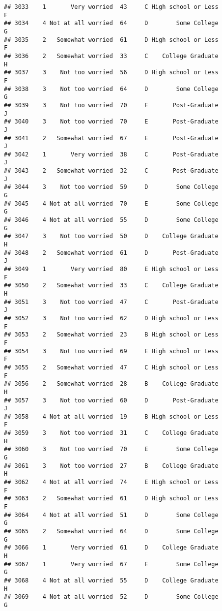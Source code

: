 \documentclass[
]{article}
\begin{document}
\begin{verbatim}
## 3033    1       Very worried  43     C High school or Less         F
## 3034    4 Not at all worried  64     D        Some College         G
## 3035    2   Somewhat worried  61     D High school or Less         F
## 3036    2   Somewhat worried  33     C    College Graduate         H
## 3037    3    Not too worried  56     D High school or Less         F
## 3038    3    Not too worried  64     D        Some College         G
## 3039    3    Not too worried  70     E       Post-Graduate         J
## 3040    3    Not too worried  70     E       Post-Graduate         J
## 3041    2   Somewhat worried  67     E       Post-Graduate         J
## 3042    1       Very worried  38     C       Post-Graduate         J
## 3043    2   Somewhat worried  32     C       Post-Graduate         J
## 3044    3    Not too worried  59     D        Some College         G
## 3045    4 Not at all worried  70     E        Some College         G
## 3046    4 Not at all worried  55     D        Some College         G
## 3047    3    Not too worried  50     D    College Graduate         H
## 3048    2   Somewhat worried  61     D       Post-Graduate         J
## 3049    1       Very worried  80     E High school or Less         F
## 3050    2   Somewhat worried  33     C    College Graduate         H
## 3051    3    Not too worried  47     C       Post-Graduate         J
## 3052    3    Not too worried  62     D High school or Less         F
## 3053    2   Somewhat worried  23     B High school or Less         F
## 3054    3    Not too worried  69     E High school or Less         F
## 3055    2   Somewhat worried  47     C High school or Less         F
## 3056    2   Somewhat worried  28     B    College Graduate         H
## 3057    3    Not too worried  60     D       Post-Graduate         J
## 3058    4 Not at all worried  19     B High school or Less         F
## 3059    3    Not too worried  31     C    College Graduate         H
## 3060    3    Not too worried  70     E        Some College         G
## 3061    3    Not too worried  27     B    College Graduate         H
## 3062    4 Not at all worried  74     E High school or Less         F
## 3063    2   Somewhat worried  61     D High school or Less         F
## 3064    4 Not at all worried  51     D        Some College         G
## 3065    2   Somewhat worried  64     D        Some College         G
## 3066    1       Very worried  61     D    College Graduate         H
## 3067    1       Very worried  67     E        Some College         G
## 3068    4 Not at all worried  55     D    College Graduate         H
## 3069    4 Not at all worried  52     D        Some College         G

\end{verbatim}
\end{document}
